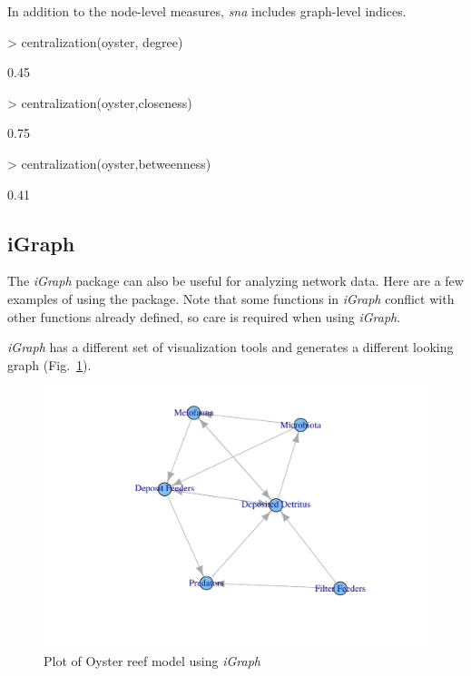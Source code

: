 \documentclass[11pt]{article}
\begin{document}
In addition to the node-level measures, \textit{sna} includes graph-level
indices.  

\begin{Schunk}
\begin{Sinput}
> centralization(oyster, degree)
\end{Sinput}
\begin{Soutput}
[1] 0.45
\end{Soutput}
\begin{Sinput}
> centralization(oyster,closeness)
\end{Sinput}
\begin{Soutput}
[1] 0.75
\end{Soutput}
\begin{Sinput}
> centralization(oyster,betweenness)
\end{Sinput}
\begin{Soutput}
[1] 0.41
\end{Soutput}
\end{Schunk}

\subsection{iGraph}
The \textit{iGraph} package can also be useful for analyzing network
data.  Here are a few examples of using the package.  Note that some
functions in \textit{iGraph} conflict with other functions already defined, so
care is required when using \textit{iGraph}.

\begin{Schunk}
\end{Schunk}

\textit{iGraph} has a different set of visualization tools and
generates a different looking graph (Fig.~\ref{fig:igraph}).

\begin{figure}
\center
\includegraphics{enaR-053}
\caption{Plot of Oyster reef model using \textit{iGraph}}\label{fig:igraph}
\end{figure}
\end{document}
